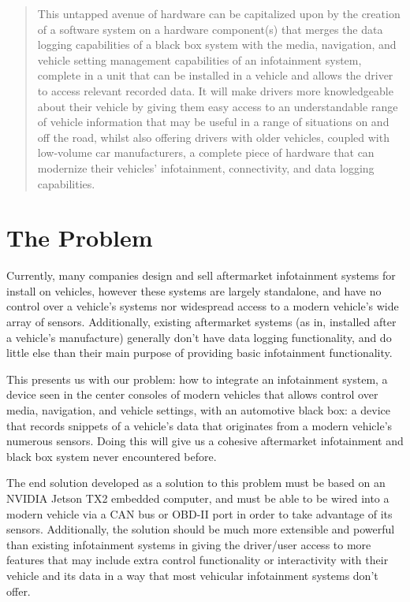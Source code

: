 \documentclass[onecolumn, draftclsnofoot,10pt, compsoc]{IEEEtran}
\begin{document}
\begin{titlepage}
\begin{singlespace}
\begin{abstract}
This untapped avenue of hardware can be capitalized upon by the creation of a software system on a hardware component(s) that merges the data logging capabilities of a black box system with the media, navigation, and vehicle setting management capabilities of an infotainment system, complete in a unit that can be installed in a vehicle and allows the driver to access relevant recorded data. 
It will make drivers more knowledgeable about their vehicle by giving them easy access to an understandable range of vehicle information that may be useful in a range of situations on and off the road, whilst also offering drivers with older vehicles, coupled with low-volume car manufacturers, a complete piece of hardware that can modernize their vehicles' infotainment, connectivity, and data logging capabilities.
        \end{abstract}     
    \end{singlespace}
\end{titlepage}
\newpage
{}
\tableofcontents
\clearpage

\section{The Problem}
Currently, many companies design and sell aftermarket infotainment systems for install on vehicles, however these systems are largely standalone, and have no control over a vehicle's systems nor widespread access to a modern vehicle's wide array of sensors. Additionally, existing aftermarket systems (as in, installed after a vehicle's manufacture) generally don't have data logging functionality, and do little else than their main purpose of providing basic infotainment functionality.\par
This presents us with our problem: how to integrate an infotainment system, a device seen in the center consoles of modern vehicles that allows control over media, navigation, and vehicle settings, with an automotive black box: a device that records snippets of a vehicle's data that originates from a modern vehicle's numerous sensors. Doing this will give us a cohesive aftermarket infotainment and black box system never encountered before.\par
The end solution developed as a solution to this problem must be based on an NVIDIA Jetson TX2 embedded computer, and must be able to be wired into a modern vehicle via a CAN bus or OBD-II port in order to take advantage of its sensors. Additionally, the solution should be much more extensible and powerful than existing infotainment systems in giving the driver/user access to more features that may include extra control functionality or interactivity with their vehicle and its data in a way that most vehicular infotainment systems don't offer.\par
\end{document}
